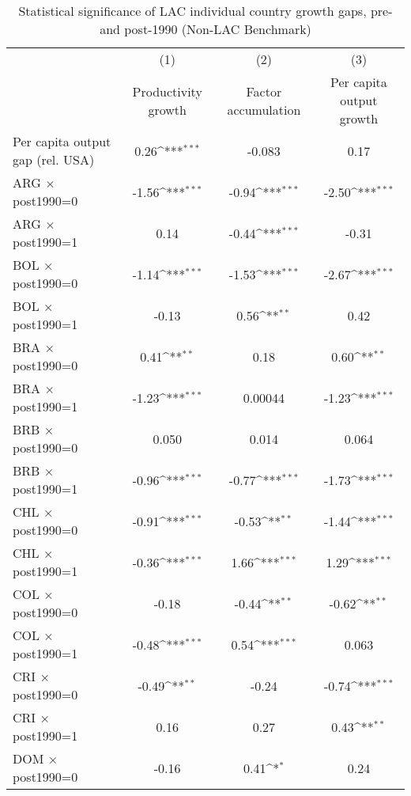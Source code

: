\begin{table}[htbp]\centering
\def\sym#1{\ifmmode^{#1}\else\(^{#1}\)\fi}
\caption{Statistical significance of LAC individual country growth gaps, pre- and post-1990 (Non-LAC Benchmark)}
\begin{tabular}{l*{3}{c}}
\toprule
                &\multicolumn{1}{c}{(1)}&\multicolumn{1}{c}{(2)}&\multicolumn{1}{c}{(3)}\\
                &\multicolumn{1}{c}{Productivity growth}&\multicolumn{1}{c}{Factor accumulation}&\multicolumn{1}{c}{Per capita output growth}\\
\midrule
Per capita output gap (rel. USA)&     0.26\sym{***}&   -0.083         &     0.17         \\
ARG $\times$ post1990=0&    -1.56\sym{***}&    -0.94\sym{***}&    -2.50\sym{***}\\
ARG $\times$ post1990=1&     0.14         &    -0.44\sym{***}&    -0.31         \\
BOL $\times$ post1990=0&    -1.14\sym{***}&    -1.53\sym{***}&    -2.67\sym{***}\\
BOL $\times$ post1990=1&    -0.13         &     0.56\sym{**} &     0.42         \\
BRA $\times$ post1990=0&     0.41\sym{**} &     0.18         &     0.60\sym{**} \\
BRA $\times$ post1990=1&    -1.23\sym{***}&  0.00044         &    -1.23\sym{***}\\
BRB $\times$ post1990=0&    0.050         &    0.014         &    0.064         \\
BRB $\times$ post1990=1&    -0.96\sym{***}&    -0.77\sym{***}&    -1.73\sym{***}\\
CHL $\times$ post1990=0&    -0.91\sym{***}&    -0.53\sym{**} &    -1.44\sym{***}\\
CHL $\times$ post1990=1&    -0.36\sym{***}&     1.66\sym{***}&     1.29\sym{***}\\
COL $\times$ post1990=0&    -0.18         &    -0.44\sym{**} &    -0.62\sym{**} \\
COL $\times$ post1990=1&    -0.48\sym{***}&     0.54\sym{***}&    0.063         \\
CRI $\times$ post1990=0&    -0.49\sym{**} &    -0.24         &    -0.74\sym{***}\\
CRI $\times$ post1990=1&     0.16         &     0.27         &     0.43\sym{**} \\
DOM $\times$ post1990=0&    -0.16         &     0.41\sym{*}  &     0.24         \\

\end{tabular}
\end{table}
